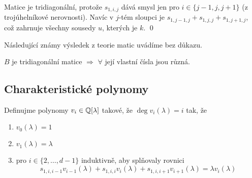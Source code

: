 \dk Matice je tridiagonální, protože $s_{1,i,j}$ dává smysl jen pro $i \in \{j-1,j,j+1\}$ (z trojúhelníkové nerovnosti). Navíc v $j$-tém sloupci je $s_{1,j-1,j} + s_{1,j,j} + s_{1,j+1,j}$, což zahrnuje všechny sousedy $u$, kterých je $k$.
\qed

Následující známy výsledek z teorie matic uvádíme bez důkazu.

\pzn $B$ je tridiagonální matice $\Rightarrow$ $\forall$ její vlastní čísla jsou různá.

\subsection{Charakteristické polynomy}


\df Definujme polynomy $v_i \in \mathbb{Q}[\lambda]$ takové, že $\deg v_i(\lambda) = i$ tak, že
\begin{enumerate} 
	\item $v_0(\lambda) = 1$
	\item $v_1(\lambda) = \lambda$
	\item pro $i \in \{ 2, \dots, d-1\}$ induktivně, aby splňovaly rovnici 
	$$
		s_{1,i,i-1} v_{i-1}(\lambda) + s_{1,i,i}v_i(\lambda) + s_{1,i,i+1}v_{i+1}(\lambda) = \lambda v_i(\lambda)
	$$
\end{enumerate}

